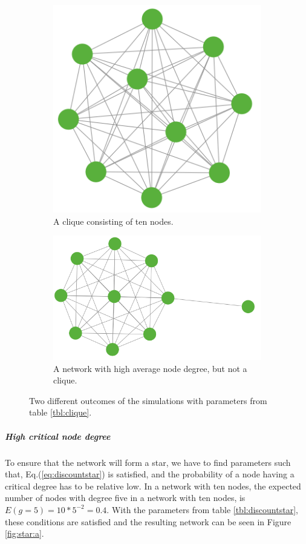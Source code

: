 \begin{figure}[h]
\centering
\begin{subfigure}{.5\textwidth}
  \centering
  \includegraphics[width=0.4\linewidth]{../Figures/discount/cliquetennodes.png}
  \caption{\label{fig:discountclique} A clique consisting of ten nodes. }
\end{subfigure}
\quad
\begin{subfigure}{.46\textwidth}
  \centering
  \includegraphics[width=0.8\linewidth]{../Figures/discount/baloontennodes.png}
  \caption{\label{fig:discountbaloon} A network with high average node degree, but not a clique.}
\end{subfigure}
\caption{\label{fig:discounthighdegree} Two different outcomes of the simulations with parameters from table \ref{tbl:clique}.}
\end{figure}

\subparagraph{High critical node degree}
To ensure that the network will form a star, we have to find parameters such that, Eq.(\ref{eq:discountstar}) is satisfied, and the probability of a node having a critical degree has to be relative low. In a network with ten nodes, the expected number of nodes with degree five in a network with ten nodes, is $E(g=5)=10*5^{-2}=0.4$. With the parameters from table \ref{tbl:discountstar}, these conditions are satisfied and the resulting network can be seen in Figure \ref{fig:star:a}.
  
